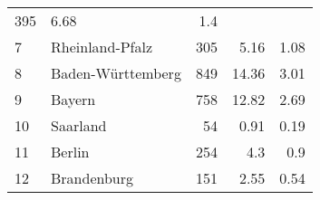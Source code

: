\begin{longtable}{lXrrr}
       \num{395} &
       \num[round-mode=places,round-precision=2]{6,68} &
         \num[round-mode=places,round-precision=2]{1,4} \\

     7 &
     \multicolumn{1}{X}{ Rheinland-Pfalz   } &


       \num{305} &
       \num[round-mode=places,round-precision=2]{5,16} &
         \num[round-mode=places,round-precision=2]{1,08} \\

     8 &
     \multicolumn{1}{X}{ Baden-Württemberg   } &


       \num{849} &
       \num[round-mode=places,round-precision=2]{14,36} &
         \num[round-mode=places,round-precision=2]{3,01} \\

     9 &
     \multicolumn{1}{X}{ Bayern   } &


       \num{758} &
       \num[round-mode=places,round-precision=2]{12,82} &
         \num[round-mode=places,round-precision=2]{2,69} \\

     10 &
     \multicolumn{1}{X}{ Saarland   } &


       \num{54} &
       \num[round-mode=places,round-precision=2]{0,91} &
         \num[round-mode=places,round-precision=2]{0,19} \\

     11 &
     \multicolumn{1}{X}{ Berlin   } &


       \num{254} &
       \num[round-mode=places,round-precision=2]{4,3} &
         \num[round-mode=places,round-precision=2]{0,9} \\

     12 &
     \multicolumn{1}{X}{ Brandenburg   } &


       \num{151} &
       \num[round-mode=places,round-precision=2]{2,55} &
         \num[round-mode=places,round-precision=2]{0,54} \\


\end{longtable}
